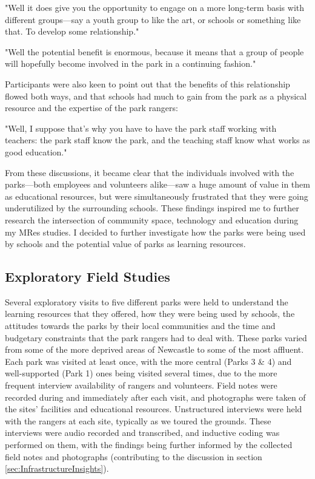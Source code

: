 \begin{displayquote}
"Well it does give you the opportunity to engage on a more long-term basis with different groups---say a youth group to like the art, or schools or something like that. To develop some relationship."
\end{displayquote}

\begin{displayquote}
"Well the potential benefit is enormous, because it means that a group of people will hopefully become involved in the park in a continuing fashion."
\end{displayquote}

Participants were also keen to point out that the benefits of this relationship flowed both ways, and that schools had much to gain from the park as a physical resource and the expertise of the park rangers:

\begin{displayquote}
"Well, I suppose that's why you have to have the park staff working with teachers: the park staff know the park, and the teaching staff know what works as good education."
\end{displayquote}

From these discussions, it became clear that the individuals involved with the parks---both employees and volunteers alike---saw a huge amount of value in them as educational resources, but were simultaneously frustrated that they were going underutilized by the surrounding schools. These findings inspired me to further research the intersection of community space, technology and education during my MRes studies. I decided to further investigate how the parks were being used by schools and the potential value of parks as learning resources.

\subsection{Exploratory Field Studies}
Several exploratory visits to five different parks were held to understand the learning resources that they offered, how they were being used by schools, the attitudes towards the parks by their local communities and the time and budgetary constraints that the park rangers had to deal with. These parks varied from some of the more deprived areas of Newcastle to some of the most affluent. Each park was visited at least once, with the more central (Parks 3 \& 4) and well-supported (Park 1) ones being visited several times, due to the more frequent interview availability of rangers and volunteers. Field notes were recorded during and immediately after each visit, and photographs were taken of the sites' facilities and educational resources. Unstructured interviews were held with the rangers at each site, typically as we toured the grounds. These interviews were audio recorded and transcribed, and inductive coding was performed on them, with the findings being further informed by the collected field notes and photographs (contributing to the discussion in section \ref{sec:InfrastructureInsights}).

